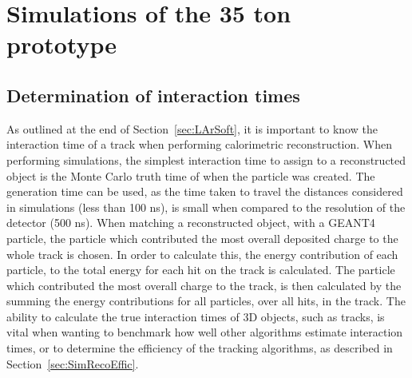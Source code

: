 \newcommand{\BigO}[1]{\ensuremath{\operatorname{O}\bigl(#1\bigr)}}


\chapter{Simulations of the 35 ton prototype} \label{chap:35tonSim} %

\graphicspath{ {35tonSimulation/Figs/Raster/} {35tonSimulation/Figs/PDF/} {35tonSimulation/Figs/Vector/} }

\section{Determination of interaction times} \label{sec:SimInteractionTimes} %
As outlined at the end of Section~\ref{sec:LArSoft}, it is important to know the interaction time of a track when performing calorimetric reconstruction. When performing simulations, the simplest interaction time to assign to a reconstructed object is the Monte Carlo truth time of when the particle was created. The generation time can be used, as the time taken to travel the distances considered in simulations (less than 100 ns), is small when compared to the resolution of the detector (500 ns). When matching a reconstructed object, with a GEANT4 particle, the particle which contributed the most overall deposited charge to the whole track is chosen. In order to calculate this, the energy contribution of each particle, to the total energy for each hit on the track is calculated. The particle which contributed the most overall charge to the track, is then calculated by the summing the energy contributions for all particles, over all hits, in the track. The ability to calculate the true interaction times of 3D objects, such as tracks, is vital when wanting to benchmark how well other algorithms estimate interaction times, or to determine the efficiency of the tracking algorithms, as described in Section~\ref{sec:SimRecoEffic}. \\

